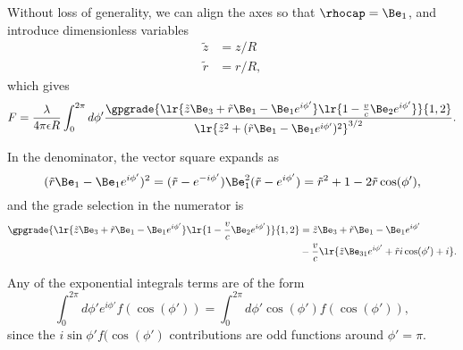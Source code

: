 Without loss of generality, we can align the axes so that \( \rhocap = \Be_1 \), and
introduce dimensionless variables
\begin{equation}\label{eqn:ringField:100}
\begin{aligned}
\tilde{z} &= z/R \\
\tilde{r} &= r/R,
\end{aligned}
\end{equation}
which gives
\begin{dmath}\label{eqn:ringField:120}
F
= \frac{\lambda}{4 \pi \epsilon R} \int_0^{2\pi} d\phi' \frac{\gpgrade{ \lr{ \tilde{z} \Be_3 + \tilde{r} \Be_1 - \Be_1 e^{i\phi'} } \lr{ 1 - \frac{v}{c} \Be_2 e^{i\phi'} } }{1,2} } { \lr{ \tilde{z}^2 + (\tilde{r} \Be_1 - \Be_1 e^{i\phi'})^2}^{3/2} }.
\end{dmath}

In the denominator, the vector square expands as
\begin{dmath}\label{eqn:ringField:140}
(\tilde{r} \Be_1 - \Be_1 e^{i\phi'})^2
=
(\tilde{r} - e^{-i\phi'}) \Be_1^2 (\tilde{r} - e^{i\phi'})
=
\tilde{r}^2 + 1 - 2 \tilde{r} \cos(\phi'),
\end{dmath}
and the grade selection in the numerator is
\begin{equation}\label{eqn:ringField:160}
\begin{aligned}
\gpgrade{ \lr{ \tilde{z} \Be_3 + \tilde{r} \Be_1 - \Be_1 e^{i\phi'} } \lr{ 1 - \frac{v}{c} \Be_2 e^{i\phi'}}}{1,2}
&=
\tilde{z} \Be_3 + \tilde{r} \Be_1 - \Be_1 e^{i\phi'} \\
&-\frac{v}{c}\lr{ \tilde{z} \Be_{31} e^{i\phi'} + \tilde{r} i \cos(\phi') + i }.
\end{aligned}
\end{equation}

Any of the exponential integrals terms
are of the form
\begin{dmath}\label{eqn:ringField:180}
\int_0^{2\pi} d\phi' e^{i\phi'} f(\cos(\phi')) = \int_0^{2\pi} d\phi' \cos(\phi') f(\cos(\phi')),
\end{dmath}
since
the \( i \sin\phi' f(\cos(\phi') \) contributions are odd functions around \( \phi' = \pi \).

